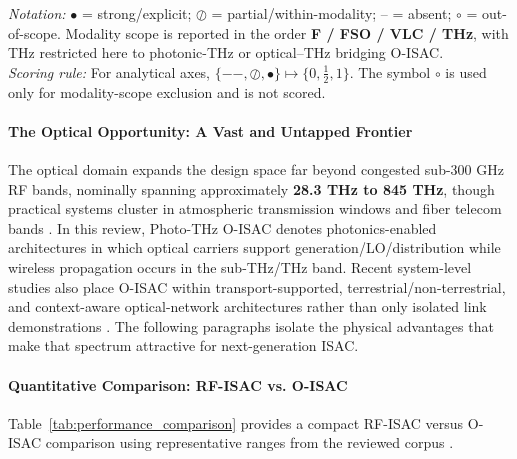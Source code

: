 \documentclass[letterpaper,journal]{IEEEtran}
\begin{document}
\begin{table}[!t]
    \vspace{2pt}
    \footnotesize
    \emph{Notation:} $\bullet$ = strong/explicit; $\oslash$ = partial/within-modality; -- = absent;
    $\circ$ = out-of-scope. Modality scope is reported in the order \textbf{F / FSO / VLC / THz},
    with THz restricted here to photonic-THz or optical--THz bridging O-ISAC.\\
    \emph{Scoring rule:} For analytical axes, $\{--,\oslash,\bullet\}\mapsto\{0,\tfrac{1}{2},1\}$.
    The symbol $\circ$ is used only for modality-scope exclusion and is not scored.
\end{table}

\paragraph{The Optical Opportunity: A Vast and Untapped Frontier}
The optical domain expands the design space far beyond congested sub-300 GHz RF bands, nominally spanning approximately \textbf{28.3 THz to 845 THz}, though practical systems cluster in atmospheric transmission windows and fiber telecom bands \cite{O_ISAC_021}. In this review, Photo-THz O-ISAC denotes photonics-enabled architectures in which optical carriers support generation/LO/distribution while wireless propagation occurs in the sub-THz/THz band. Recent system-level studies also place O-ISAC within transport-supported, terrestrial/non-terrestrial, and context-aware optical-network architectures rather than only isolated link demonstrations \cite{O_ISAC_059,O_ISAC_088,O_ISAC_101}. The following paragraphs isolate the physical advantages that make that spectrum attractive for next-generation ISAC.
\paragraph{Quantitative Comparison: RF-ISAC vs. O-ISAC}

Table~\ref{tab:performance_comparison} provides a compact RF-ISAC versus O-ISAC comparison using representative ranges from the reviewed corpus \cite{O_ISAC_021}.
\end{document}
